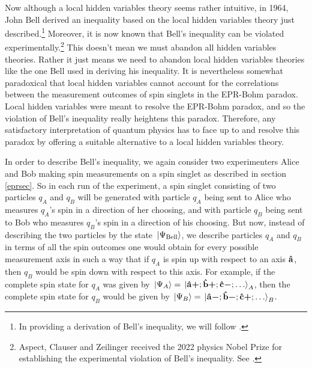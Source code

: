 Now although a local hidden variables theory seems rather intuitive, in 1964, John Bell derived an inequality based on the local hidden variables theory just described.\footnote{In providing a derivation of Bell's inequality, we will follow \cite[241-249]{Sakurai}.} Moreover, it is now known that Bell's inequality can be { violated experimentally.\footnote{Aspect, Clauser and Zeilinger received the 2022 physics Nobel Prize for establishing the experimental violation of Bell's inequality. See \cite{Nobel2022}.} This} doesn't mean we must abandon all hidden variables theories. Rather it just means we need to abandon local hidden variables theories like the one Bell used in deriving his inequality.  It is nevertheless somewhat paradoxical that local hidden variables cannot account for the correlations between the measurement outcomes of spin singlets in the EPR-Bohm paradox. Local hidden variables were meant to resolve the EPR-Bohm paradox, and so the violation of Bell's inequality really heightens this paradox. Therefore, any satisfactory interpretation of quantum physics has to face up to and resolve this paradox by offering a suitable alternative to a local hidden variables theory. 

In order to describe Bell's inequality, we again consider two experimenters Alice and Bob making spin measurements on a spin singlet as described in section \ref{eprsec}. So in each run of the experiment, a spin singlet consisting of two particles $q_A$ and $q_B$ will be generated with particle $q_A$ being sent to Alice who measures $q_A$'s spin in a direction of her choosing, and with particle $q_B$ being sent to Bob who measures $q_B$'s spin in a direction of his choosing.  But now, instead of describing the two particles by the state $\ket*{\Psi_{\text{Bell}}}$, we describe particles $q_A$ and $q_B$ in terms of all the spin outcomes one would obtain for every possible measurement axis in such a way that if $q_A$ is spin up with respect to an axis $\vb{\hat{{a}}}$, then $q_B$ would be spin down with respect to this axis. For example, if the complete spin state for $q_A$ was given by $\ket*{\Psi_A}=\ket*{{\vb{\hat{{a}}}\bm{+}};{\vb{\hat{{b}}}\bm{+}};{\vb{\hat{{c}}}\bm{-}};\ldots}_A$, then the complete spin state for $q_B$ would be given by $\ket*{\Psi_B}=\ket*{{\vb{\hat{{a}}}\bm{-}};{\vb{\hat{{b}}}\bm{-}};{\vb{\hat{{c}}}\bm{+}};\ldots}_B$.

